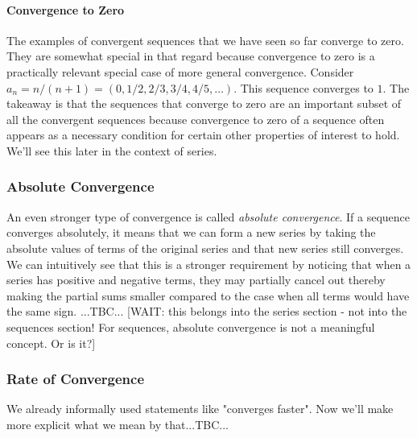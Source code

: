 \paragraph{Convergence to Zero} The examples of convergent sequences that we have seen so far converge to zero. They are somewhat special in that regard because convergence to zero is a practically relevant special case of more general convergence. Consider $a_n = n/(n+1) = (0,1/2,2/3,3/4,4/5,\ldots)$. This sequence converges to $1$. The takeaway is that the sequences that converge to zero are an important subset of all the convergent sequences because convergence to zero of a sequence often appears as a necessary condition for certain other properties of interest to hold. We'll see this later in the context of series.




\subsubsection{Absolute Convergence}
An even stronger type of convergence is called \emph{absolute convergence}. If a sequence converges absolutely, it means that we can form a new series by taking the absolute values of terms of the original series and that new series still converges. We can intuitively see that this is a stronger requirement by noticing that when a series has positive and negative terms, they may partially cancel out thereby making the partial sums smaller compared to the case when all terms would have the same sign. ...TBC...
[WAIT: this belongs into the series section - not into the sequences section! For sequences, absolute convergence is not a meaningful concept. Or is it?]





\subsubsection{Rate of Convergence}
We already informally used statements like "converges faster". Now we'll make more explicit what we mean by that...TBC...

